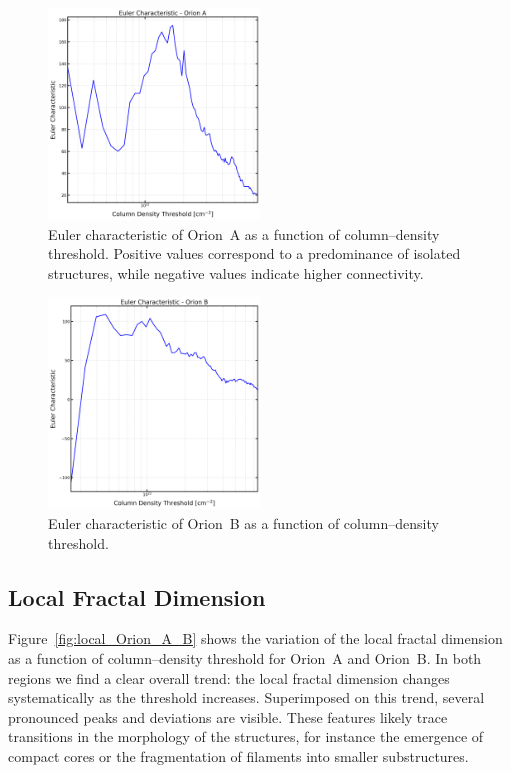 \begin{figure}[t]
    \centering
    \includegraphics[width=0.5\textwidth]{figures/euler_Orion_A_no_figs.png}
    \caption{Euler characteristic of Orion~A as a function of column–density threshold. Positive values correspond to a predominance of isolated structures, while negative values indicate higher connectivity.}
    \label{fig:Euler_Orion_A_no_figs}
\end{figure}

\begin{figure}[t]
    \centering
    \includegraphics[width=0.5\textwidth]{figures/euler_Orion_B_no_figs.png}
    \caption{Euler characteristic of Orion~B as a function of column–density threshold.}
    \label{fig:Euler_Orion_B_no_figs}
\end{figure}

\subsection{Local Fractal Dimension}

Figure~\ref{fig:local_Orion_A_B} shows the variation of the local fractal dimension as a function of column--density threshold for Orion~A and Orion~B. In both regions we find a clear overall trend: the local fractal dimension changes systematically as the threshold increases. Superimposed on this trend, several pronounced peaks and deviations are visible. These features likely trace transitions in the morphology of the structures, for instance the emergence of compact cores or the fragmentation of filaments into smaller substructures.

